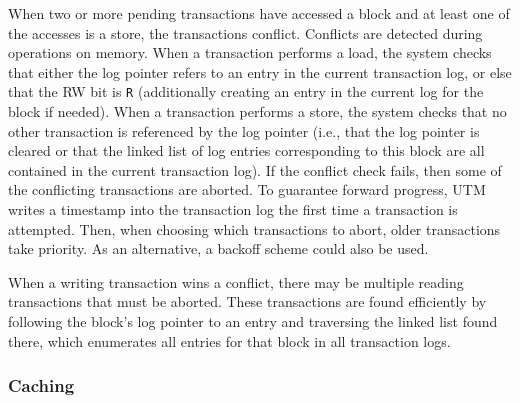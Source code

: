 When two or more pending transactions have accessed a block and at
least one of the accesses is a store, the transactions conflict.
Conflicts are detected during operations on memory.  When a
transaction performs a load, the system checks that either the log
pointer refers to an entry in the current transaction log, or else
that the RW bit is \texttt{R} (additionally creating an entry in the
current log for the block if needed).  When a transaction performs a
store, the system checks that no other transaction is referenced by
the log pointer (i.e., that the log pointer is cleared or that the
linked list of log entries corresponding to this block are all
contained in the current transaction log).  If the conflict check
fails, then some of the conflicting transactions are aborted.  To
guarantee forward progress, UTM writes a timestamp into the
transaction log the first time a transaction is attempted.  Then, when
choosing which transactions to abort, older transactions take
priority.  As an alternative, a backoff scheme \cite{MetcalfeBo76}
could also be used.

When a writing transaction wins a conflict, there may be multiple
reading transactions that must be aborted.  These transactions are
found efficiently by following the block's log pointer to an entry and
traversing the linked list found there, which enumerates all entries
for that block in all transaction logs.


\subsubsection{Caching}

